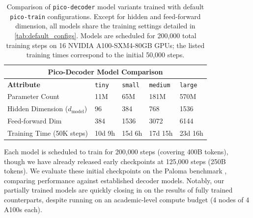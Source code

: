 \begin{table}[h!]
    \centering
    \renewcommand{\arraystretch}{1.2}
    \begin{tabular}{|p{}||p{}|p{}|p{}|p{}|}
    \hline
    \multicolumn{5}{|c|}{\textbf{Pico-Decoder Model Comparison}} \\
    \hline
    \textbf{Attribute} & \texttt{tiny} & \texttt{small} & \texttt{medium} & \texttt{large} \\
    \hline
    Parameter Count & 11M & 65M & 181M & 570M \\
    Hidden Dimension ($d_{\text{model}}$) & 96 & 384 & 768 & 1536 \\
    Feed-forward Dim & 384 & 1536 & 3072 & 6144 \\
    Training Time (50K steps) & 10d 9h & 15d 6h & 17d 15h & 23d 16h \\
    \hline
    \end{tabular}
    \vspace{0.5em}
    \caption{Comparison of \texttt{pico-decoder} model variants trained with default \texttt{pico-train} configurations. Except for hidden and feed-forward dimension, all models share the training settings detailed in \cref{tab:default_configs}. Models are scheduled for 200,000 total training steps on 16 NVIDIA A100-SXM4-80GB GPUs; the listed training times correspond to the initial 50,000 steps.}
    \label{tab:pico-decoder-configs}
    \end{table}

Each model is scheduled to train for 200,000 steps (covering 400B tokens), though we have already released early checkpoints at 125,000 steps (250B tokens). We evaluate these initial checkpoints on the Paloma benchmark \citep{magnusson2024paloma}, comparing performance against established decoder models. Notably, our partially trained models are quickly closing in on the results of fully trained counterparts, despite running on an academic-level compute budget (4 nodes of 4 A100s each).


